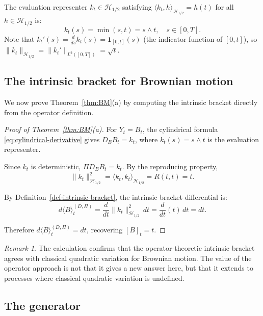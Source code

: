 \documentclass[12pt]{article}
\theoremstyle{plain}
\theoremstyle{definition}
\theoremstyle{remark}
\newtheorem{remark}[theorem]{Remark}
\newcommand{\HH}{\mathcal{H}}
\begin{document}
The evaluation representer $k_t \in \HH_{1/2}$ satisfying $\langle k_t, h \rangle_{\HH_{1/2}} = h(t)$ for all $h \in \HH_{1/2}$ is:
\begin{equation}\label{eq:BM-representer}
k_t(s) = \min(s,t) = s \wedge t, \quad s \in [0,T].
\end{equation}
Note that $k_t'(s) = \frac{d}{ds}k_t(s) = \mathbf{1}_{[0,t]}(s)$ (the indicator function of $[0,t]$), so $\|k_t\|_{\HH_{1/2}} = \|k_t'\|_{L^2([0,T])} = \sqrt{t}$.

\subsection{The intrinsic bracket for Brownian motion}

We now prove Theorem~\ref{thm:BM}(a) by computing the intrinsic bracket directly from the operator definition.

\begin{proof}[Proof of Theorem~\ref{thm:BM}(a)]
For $Y_t = B_t$, the cylindrical formula \eqref{eq:cylindrical-derivative} gives $D_B B_t = k_t$, where $k_t(s) = s \wedge t$ is the evaluation representer.

Since $k_t$ is deterministic, $\Pi D_B B_t = k_t$. By the reproducing property,
\begin{equation}\label{eq:BM-bracket-1}
\|k_t\|_{\HH_{1/2}}^2 = \langle k_t, k_t \rangle_{\HH_{1/2}} = R(t,t) = t.
\end{equation}

By Definition~\ref{def:intrinsic-bracket}, the intrinsic bracket differential is:
\begin{equation}\label{eq:BM-bracket-2}
d\langle B \rangle_t^{(D,\Pi)} = \frac{d}{dt}\|k_t\|_{\HH_{1/2}}^2 \, dt = \frac{d}{dt}(t) \, dt = dt.
\end{equation}

Therefore $d\langle B \rangle_t^{(D,\Pi)} = dt$, recovering $[B]_t = t$.
\end{proof}

\begin{remark}\label{rmk:BM-classical}
The calculation confirms that the operator-theoretic intrinsic bracket agrees with classical quadratic variation for Brownian motion. The value of the operator approach is not that it gives a new answer here, but that it extends to processes where classical quadratic variation is undefined.
\end{remark}

\subsection{The generator}
\end{document}
